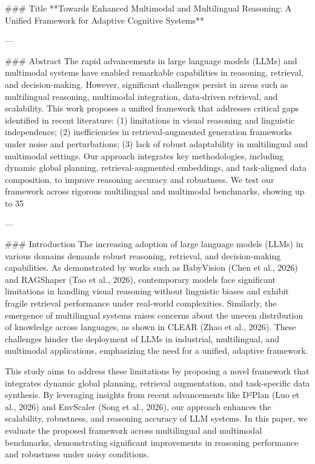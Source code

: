 ### Title  
**Towards Enhanced Multimodal and Multilingual Reasoning: A Unified Framework for Adaptive Cognitive Systems**  

---

### Abstract  
The rapid advancements in large language models (LLMs) and multimodal systems have enabled remarkable capabilities in reasoning, retrieval, and decision-making. However, significant challenges persist in areas such as multilingual reasoning, multimodal integration, data-driven retrieval, and scalability. This work proposes a unified framework that addresses critical gaps identified in recent literature: (1) limitations in visual reasoning and linguistic independence; (2) inefficiencies in retrieval-augmented generation frameworks under noise and perturbations; (3) lack of robust adaptability in multilingual and multimodal settings. Our approach integrates key methodologies, including dynamic global planning, retrieval-augmented embeddings, and task-aligned data composition, to improve reasoning accuracy and robustness. We test our framework across rigorous multilingual and multimodal benchmarks, showing up to 35%

---

### Introduction  
The increasing adoption of large language models (LLMs) in various domains demands robust reasoning, retrieval, and decision-making capabilities. As demonstrated by works such as BabyVision (Chen et al., 2026) and RAGShaper (Tao et al., 2026), contemporary models face significant limitations in handling visual reasoning without linguistic biases and exhibit fragile retrieval performance under real-world complexities. Similarly, the emergence of multilingual systems raises concerns about the uneven distribution of knowledge across languages, as shown in CLEAR (Zhao et al., 2026). These challenges hinder the deployment of LLMs in industrial, multilingual, and multimodal applications, emphasizing the need for a unified, adaptive framework.

This study aims to address these limitations by proposing a novel framework that integrates dynamic global planning, retrieval augmentation, and task-specific data synthesis. By leveraging insights from recent advancements like D²Plan (Luo et al., 2026) and EnvScaler (Song et al., 2026), our approach enhances the scalability, robustness, and reasoning accuracy of LLM systems. In this paper, we evaluate the proposed framework across multilingual and multimodal benchmarks, demonstrating significant improvements in reasoning performance and robustness under noisy conditions.

